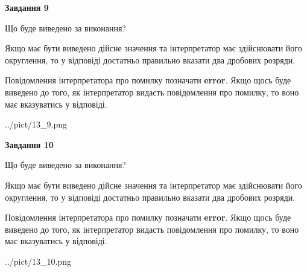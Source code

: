 \documentclass[12pt, ukrainian]{article}
\begin{document}
{\begin {Large}
{\begin {center}\textbf{Завдання 9}\end {center}}\par
Що буде виведено за виконання? \par

Якщо має бути виведено дійсне значення та інтерпретатор має здійснювати його округлення, 
то у відповіді достатньо правильно вказати два дробових розряди.

Повідомлення інтерпретатора про помилку позначати \textbf{error}.
Якщо щось буде виведено до того, як інтерпретатор видасть повідомлення про помилку, 
то воно має вказуватись у відповіді. \par

\begin{center}
	{../pict/13_9.png}
\end{center}
\newpage

{\begin {center}\textbf{Завдання 10}\end {center}}\par
Що буде виведено за виконання? \par

Якщо має бути виведено дійсне значення та інтерпретатор має здійснювати його округлення, 
то у відповіді достатньо правильно вказати два дробових розряди.

Повідомлення інтерпретатора про помилку позначати \textbf{error}.
Якщо щось буде виведено до того, як інтерпретатор видасть повідомлення про помилку, 
то воно має вказуватись у відповіді. \par

\begin{center}
	{../pict/13_10.png}
\end{center}
\newpage

\end {Large}}
\end{document}
